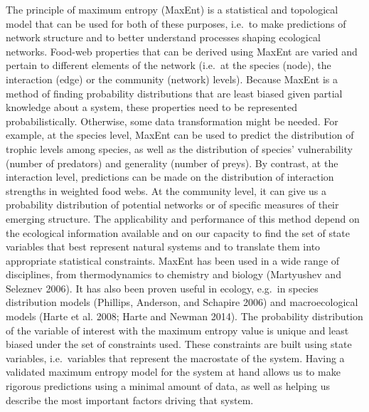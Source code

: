 \documentclass[11pt]{article}
\begin{document}
The principle of maximum entropy (MaxEnt) is a statistical and
topological model that can be used for both of these purposes, i.e.~to
make predictions of network structure and to better understand processes
shaping ecological networks. Food-web properties that can be derived
using MaxEnt are varied and pertain to different elements of the network
(i.e.~at the species (node), the interaction (edge) or the community
(network) levels). Because MaxEnt is a method of finding probability
distributions that are least biased given partial knowledge about a
system, these properties need to be represented probabilistically.
Otherwise, some data transformation might be needed. For example, at the
species level, MaxEnt can be used to predict the distribution of trophic
levels among species, as well as the distribution of species'
vulnerability (number of predators) and generality (number of preys). By
contrast, at the interaction level, predictions can be made on the
distribution of interaction strengths in weighted food webs. At the
community level, it can give us a probability distribution of potential
networks or of specific measures of their emerging structure. The
applicability and performance of this method depend on the ecological
information available and on our capacity to find the set of state
variables that best represent natural systems and to translate them into
appropriate statistical constraints. MaxEnt has been used in a wide
range of disciplines, from thermodynamics to chemistry and biology
(Martyushev and Seleznev 2006). It has also been proven useful in
ecology, e.g.~in species distribution models (Phillips, Anderson, and
Schapire 2006) and macroecological models (Harte et al. 2008; Harte and
Newman 2014). The probability distribution of the variable of interest
with the maximum entropy value is unique and least biased under the set
of constraints used. These constraints are built using state variables,
i.e.~variables that represent the macrostate of the system. Having a
validated maximum entropy model for the system at hand allows us to make
rigorous predictions using a minimal amount of data, as well as helping
us describe the most important factors driving that system.
\end{document}
